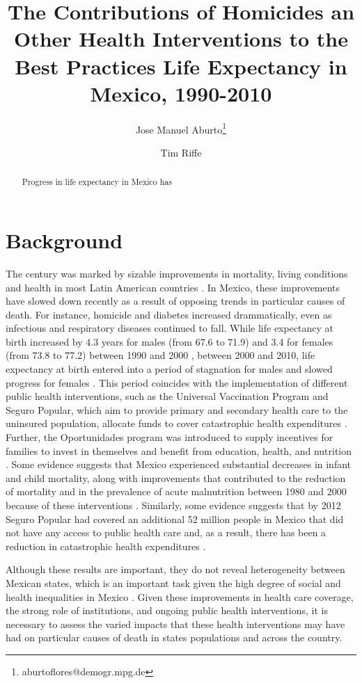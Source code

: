 \documentclass{article}
\title{The Contributions of Homicides an Other Health Interventions to the  Best Practices Life Expectancy in Mexico, 1990-2010}
\author[1]{Jose Manuel Aburto\thanks{aburtoflores@demogr.mpg.de}}
\author[2]{Tim Riffe}
\affil[1]{Max Planck Institute for Demographic Research, EDSD}
\affil[2]{Max Planck Institute for Demographic Research}
\begin{document}
\maketitle

\begin{abstract}
Progress in life expectancy in Mexico has


\end{abstract}


\section*{Background}
The  century was marked by sizable improvements in mortality, living
conditions and health in most Latin American countries \citep{who2000}. In
Mexico, these improvements have slowed down recently as a result of opposing
trends in particular causes of death. For instance, homicide and diabetes
increased drammatically, even as infectious and
respiratory diseases continued to fall. While life
expectancy at birth increased by 4.3 years for males (from 67.6 to 71.9) and 3.4
for females (from 73.8 to 77.2) between 1990 and 2000 \citep{SOMEDE},
between 2000 and 2010, life expectancy at birth entered into a period of
stagnation for males and slowed progress for females \citep{canudas2014}. This
period coincides with the implementation of different public health
interventions, such as the Universal Vaccination Program and Seguro
Popular, which aim to provide primary and secondary
health care to the uninsured population, allocate funds to cover catastrophic
health expenditures \citep{knaul2005}. Further, the Oportunidades program
was introduced to supply incentives for families to invest in themselves and
benefit from education, health, and nutrition \citep{neufeld2012}. Some evidence
suggests that Mexico experienced substantial decreases in infant and child
mortality, along with improvements that contributed to the reduction of
mortality and in the prevalence of acute malnutrition between 1980 and 2000
because of these interventions \citep{sepulveda2006}. Similarly, some evidence
suggests that by 2012 Seguro Popular had covered an additional 52 million
people in Mexico that did not have any access to public health care and, as a result, there has been a reduction in catastrophic health expenditures \citep{knaul2012}.

 Although these results are important, they do not reveal heterogeneity between
 Mexican states, which is an important task given the high degree of social and
 health inequalities in Mexico \citep{Frenk2006}. Given these improvements
 in health care coverage, the strong role of institutions, and ongoing public
 health interventions, it is necessary to assess the varied impacts that
 these health interventions may have had on particular causes of death in states
 populations and across the country.
 
\end{document}
